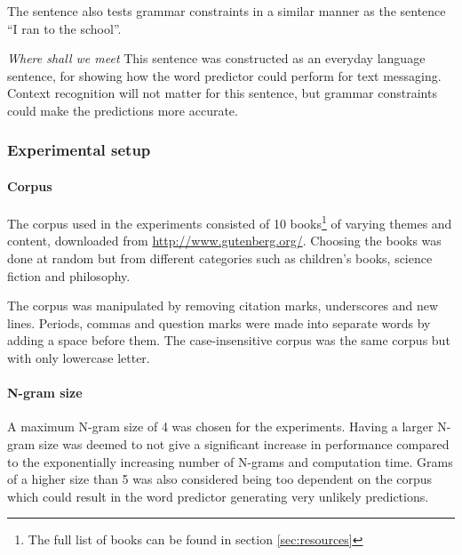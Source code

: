 The sentence also tests grammar constraints in a similar manner as the sentence “I ran to the school”.

\emph{Where shall we meet}
This sentence was constructed as an everyday language sentence, for showing how the word predictor could perform for text messaging. Context recognition will not matter for this sentence, but grammar constraints could make the predictions more accurate.

\subsubsection{Experimental setup}
\paragraph{Corpus}
The corpus used in the experiments consisted of 10 books\footnote{The full list of books can be found in section \ref{sec:resources}} of varying themes and content, downloaded from \url{http://www.gutenberg.org/}. Choosing the books was done at random but from different categories such as children's books, science fiction and philosophy.

The corpus was manipulated by removing citation marks, underscores and new lines. Periods, commas and question marks were made into separate words by adding a space before them. The case-insensitive corpus was the same corpus but with only lowercase letter.

\paragraph{N-gram size}
A maximum N-gram size of 4 was chosen for the experiments. Having a larger N-gram size was deemed to not give a significant increase in performance compared to the exponentially increasing number of N-grams and computation time. Grams of a higher size than 5 was also considered being too dependent on the corpus which could result in the word predictor generating very unlikely predictions.